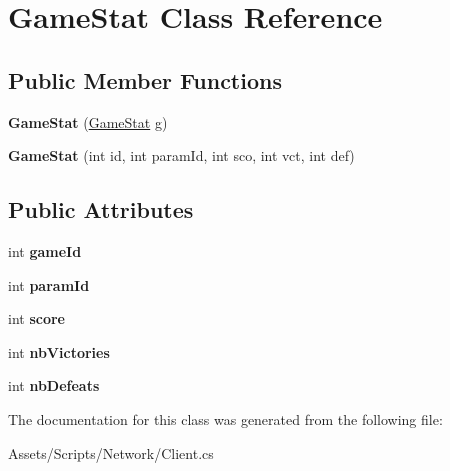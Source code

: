 \hypertarget{class_game_stat}{\section{Game\-Stat Class Reference}
\label{class_game_stat}
}
\subsection*{Public Member Functions}
\begin{DoxyCompactItemize}
\item 
\hypertarget{class_game_stat_ae6d68bc8078ee0cd1b047e31bf269dff}{{\bfseries Game\-Stat} (\hyperlink{class_game_stat}{Game\-Stat} g)}\label{class_game_stat_ae6d68bc8078ee0cd1b047e31bf269dff}

\item 
\hypertarget{class_game_stat_a0e564f59e6128db821024e55089b2f8c}{{\bfseries Game\-Stat} (int id, int param\-Id, int sco, int vct, int def)}\label{class_game_stat_a0e564f59e6128db821024e55089b2f8c}

\end{DoxyCompactItemize}
\subsection*{Public Attributes}
\begin{DoxyCompactItemize}
\item 
\hypertarget{class_game_stat_a9b0180da04cd650f58b552fa8dc89769}{int {\bfseries game\-Id}}\label{class_game_stat_a9b0180da04cd650f58b552fa8dc89769}

\item 
\hypertarget{class_game_stat_a5f2d3e5276deaf245f1fbb8fd94558a2}{int {\bfseries param\-Id}}\label{class_game_stat_a5f2d3e5276deaf245f1fbb8fd94558a2}

\item 
\hypertarget{class_game_stat_a0a01b8aa17c59c6f24e1a1cb11a17e83}{int {\bfseries score}}\label{class_game_stat_a0a01b8aa17c59c6f24e1a1cb11a17e83}

\item 
\hypertarget{class_game_stat_a7576b8eb54cd1e39237ede8807249062}{int {\bfseries nb\-Victories}}\label{class_game_stat_a7576b8eb54cd1e39237ede8807249062}

\item 
\hypertarget{class_game_stat_ad56a66386bcec72fea163f4e5d809ad9}{int {\bfseries nb\-Defeats}}\label{class_game_stat_ad56a66386bcec72fea163f4e5d809ad9}

\end{DoxyCompactItemize}


The documentation for this class was generated from the following file\-:\begin{DoxyCompactItemize}
\item 
Assets/\-Scripts/\-Network/Client.\-cs\end{DoxyCompactItemize}
